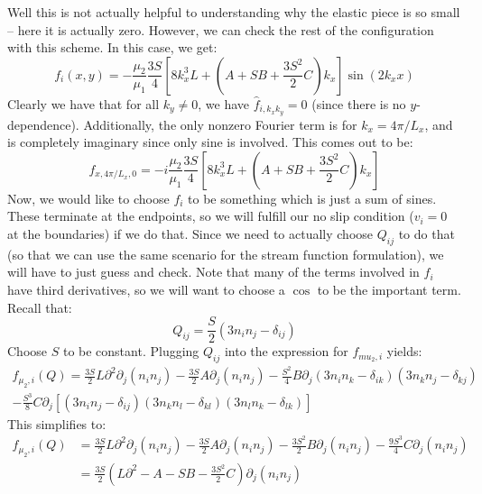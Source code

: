 \documentclass[reqno]{article}
\begin{document}
	Well this is not actually helpful to understanding why the elastic piece is so small -- here it is actually zero.
	However, we can check the rest of the configuration with this scheme. 
	In this case, we get:
	\begin{equation}
	f_{i} (x, y) = - \frac{\mu_2}{\mu_1} \frac{3 S}{4} 
	\left[
	8 k_x^3 L 
	+ \left( A + S B + \frac{3 S^2}{2} C \right)
	k_x 
	\right] \sin \left( 2 k_x x \right)
	\end{equation}
	Clearly we have that for all $k_y \neq 0$, we have $\hat{f}_{i, k_x k_y} = 0$ (since there is no $y$-dependence).
	Additionally, the only nonzero Fourier term is for $k_x = 4 \pi / L_x$, and is completely imaginary since only sine is involved. 
	This comes out to be:
	\begin{equation}
	f_{x, 4 \pi / L_x, 0} = - i \frac{\mu_2}{\mu_1} \frac{3 S}{4} 
	\left[
	8 k_x^3 L 
	+ \left( A + S B + \frac{3 S^2}{2} C \right)
	k_x 
	\right]
	\end{equation}
	Now, we would like to choose $f_i$ to be something which is just a sum of sines.
	These terminate at the endpoints, so we will fulfill our no slip condition ($v_i = 0$ at the boundaries) if we do that.
	Since we need to actually choose $Q_{ij}$ to do that (so that we can use the same scenario for the stream function formulation), we will have to just guess and check.
	Note that many of the terms involved in $f_i$ have third derivatives, so we will want to choose a $\cos$ to be the important term. 
	Recall that:
	\begin{equation}
		Q_{ij} 
		= \frac{S}{2} \left( 3 n_i n_j - \delta_{ij} \right)
	\end{equation}
	Choose $S$ to be constant. 
	Plugging $Q_{ij}$ into the expression for $f_{mu_2, i}$ yields:
	\begin{multline}
		f_{\mu_2, i} (Q)
		= \frac{3 S}{2} L \partial^2 \partial_j \left( n_i n_j \right)
		- \frac{3 S}{2} A \partial_j \left( n_i n_j \right)
		- \frac{S^2}{4} B \partial_j 
		\left( 3 n_i n_k - \delta_{ik} \right)
		\left( 3 n_k n_j - \delta_{kj} \right)\\
		- \frac{S^3}{8} C \partial_j
		\left[
		\left( 3 n_i n_j - \delta_{ij} \right)
		\left( 3 n_k n_l - \delta_{kl} \right)
		\left( 3 n_l n_k - \delta_{lk} \right)
		\right]
	\end{multline}
	This simplifies to:
	\begin{equation}
	\begin{split}
		f_{\mu_2, i} (Q)
		&= \frac{3 S}{2} L \partial^2 \partial_j \left( n_i n_j \right)
		- \frac{3 S}{2} A \partial_j \left( n_i n_j \right)
		- \frac{3 S^2}{2} B \partial_j \left( n_i n_j \right)
		- \frac{9 S^3}{4} C \partial_j
		\left( n_i n_j \right) \\
		&= \frac{3 S}{2} 
		\left(
		L \partial^2 - A - S B - \frac{3 S^2}{2} C
		\right)
		\partial_j \left( n_i n_j \right)
	\end{split}
	\end{equation}
\end{document}
